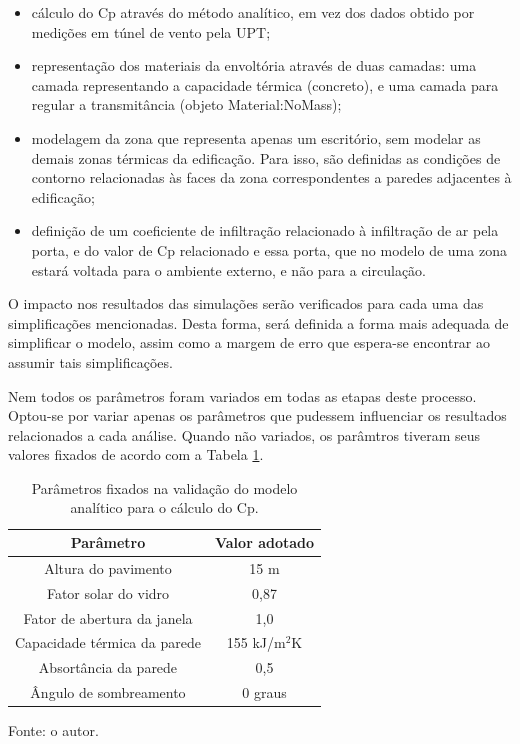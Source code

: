 \documentclass[brazil,hardcopy,openany,a5paper]{ufscthesis}
\begin{document}
		\begin{itemize}
		\item cálculo do Cp através do método analítico, em vez dos dados obtido por medições em túnel de vento pela UPT;
		\item representação dos materiais da envoltória através de duas camadas: uma camada representando a capacidade térmica (concreto), e uma camada para regular a transmitância (objeto Material:NoMass);
		\item modelagem da zona que representa apenas um escritório, sem modelar as demais zonas térmicas da edificação. Para isso, são definidas as condições de contorno relacionadas às faces da zona correspondentes a paredes adjacentes à edificação;
		\item definição de um coeficiente de infiltração relacionado à infiltração de ar pela porta, e do valor de Cp relacionado e essa porta, que no modelo de uma zona estará voltada para o ambiente externo, e não para a circulação.
		\end{itemize}
		
		O impacto nos resultados das simulações serão verificados para cada uma das simplificações mencionadas. Desta forma, será definida a forma mais adequada de simplificar o modelo, assim como a margem de erro que espera-se encontrar ao assumir tais simplificações.
		
		Nem todos os parâmetros foram variados em todas as etapas deste processo. Optou-se por variar apenas os parâmetros que pudessem influenciar os resultados relacionados a cada análise. Quando não variados, os parâmtros tiveram seus valores fixados de acordo com a Tabela \ref{table:paramfix}.
		
		\begin{table}[h]
			\centering
			\caption{Parâmetros fixados na validação do modelo analítico para o cálculo do Cp.}
			\label{table:paramfix}
			\begin{tabular}{|c |c |}
				\hline
				\textbf{Parâmetro} & \textbf{Valor adotado} \\
				\hline
				Altura do pavimento & 15 m \\
				\hline
				Fator solar do vidro & 0,87 \\
				\hline
				Fator de abertura da janela & 1,0 \\
				\hline
				Capacidade térmica da parede & 155 kJ/m$^2$K \\
				\hline
				Absortância da parede & 0,5 \\
				\hline 
				Ângulo de sombreamento & 0 graus \\
				\hline 
			\end{tabular}
			\begin{flushleft}
				Fonte: o autor.
			\end{flushleft}				
		\end{table}
		
\end{document}

